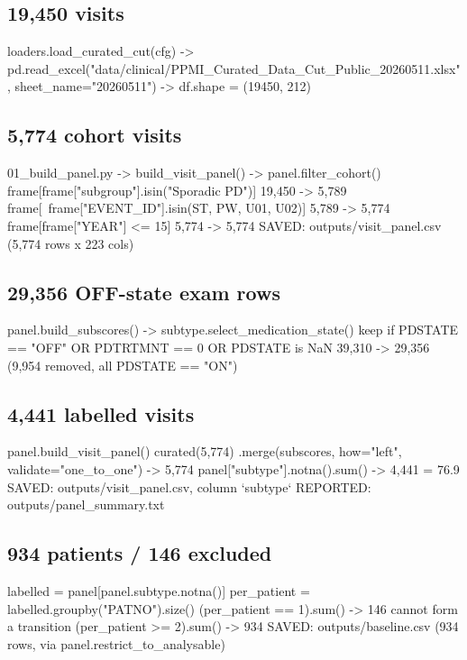 \documentclass[11pt,a4paper]{article}
\begin{document}
\subsection*{19{,}450 visits}
\begin{codeblock}
loaders.load_curated_cut(cfg)
  -> pd.read_excel("data/clinical/PPMI_Curated_Data_Cut_Public_20260511.xlsx",
                   sheet_name="20260511")
  -> df.shape = (19450, 212)
\end{codeblock}

\subsection*{5{,}774 cohort visits}
\begin{codeblock}
01_build_panel.py -> build_visit_panel() -> panel.filter_cohort()
  frame[frame["subgroup"].isin({"Sporadic PD"})]           19,450 -> 5,789
  frame[~frame["EVENT_ID"].isin({ST, PW, U01, U02})]        5,789 -> 5,774
  frame[frame["YEAR"] <= 15]                                5,774 -> 5,774
  SAVED: outputs/visit_panel.csv  (5,774 rows x 223 cols)
\end{codeblock}

\subsection*{29{,}356 OFF-state exam rows}
\begin{codeblock}
panel.build_subscores() -> subtype.select_medication_state()
  keep if PDSTATE == "OFF"  OR  PDTRTMNT == 0  OR  PDSTATE is NaN
  39,310 -> 29,356    (9,954 removed, all PDSTATE == "ON")
\end{codeblock}

\subsection*{4{,}441 labelled visits}
\begin{codeblock}
panel.build_visit_panel()
  curated(5,774) .merge(subscores, how="left", validate="one_to_one")  -> 5,774
  panel["subtype"].notna().sum()                                       -> 4,441
  = 76.9%
  SAVED: outputs/visit_panel.csv, column `subtype`
  REPORTED: outputs/panel_summary.txt
\end{codeblock}

\subsection*{934 patients / 146 excluded}
\begin{codeblock}
labelled = panel[panel.subtype.notna()]
per_patient = labelled.groupby("PATNO").size()
  (per_patient == 1).sum()  -> 146     cannot form a transition
  (per_patient >= 2).sum()  -> 934
  SAVED: outputs/baseline.csv  (934 rows, via panel.restrict_to_analysable)
\end{codeblock}
\end{document}
